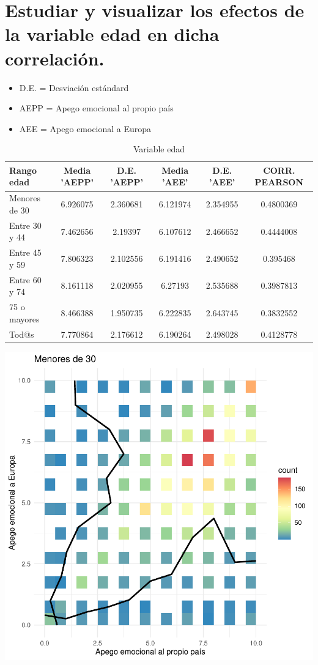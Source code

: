 \documentclass{article}
\begin{document}
\section{Estudiar y visualizar los efectos de la variable edad en dicha correlación.}
 \begin{itemize}
 \item D.E. = Desviación estándard
 \item AEPP = Apego emocional al propio país
 \item AEE = Apego emocional a Europa
 \end{itemize}
 \begin{table}[h!]
 \caption{Variable edad}
 \begin{tabular}{l | c c c c c}
 \hline
 \bf{Rango edad} & \bf{Media 'AEPP'} & \bf{D.E. 'AEPP'} & \bf{Media 'AEE'} & \bf{D.E. 'AEE'} & \bf{CORR. PEARSON} \\
 \hline
 Menores de 30 & 6.926075 & 2.360681 & 6.121974 & 2.354955 & 0.4800369 \\
 Entre 30 y 44 & 7.462656 & 2.19397 & 6.107612 & 2.466652 & 0.4444008 \\
 Entre 45 y 59 & 7.806323 & 2.102556 & 6.191416 & 2.490652 & 0.395468 \\
 Entre 60 y 74 & 8.161118 & 2.020955 & 6.27193 & 2.535688 & 0.3987813 \\
 75 o mayores & 8.466388 & 1.950735 & 6.222835 & 2.643745 & 0.3832552 \\
 Tod@s & 7.770864 & 2.176612 & 6.190264 & 2.498028 & 0.4128778 \\
 \hline
 \end{tabular}
 \end{table}
 
\includegraphics{Informe-007}
\end{document}
